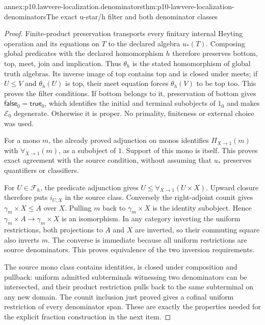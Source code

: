 
\begin{annexitem}{annex:p10.lawvere-localization.denominators}{thm:p10-lawvere-localization-denominators}{The exact u-star/h filter and both denominator classes}
\begin{proof}
Finite-product preservation transports every finitary
internal Heyting operation and its equations on \(T\)
to the declared algebra \(u_*(T)\).  Composing global
predicates with the declared homomorphism \(h\) therefore
preserves bottom, top, meet, join and implication.  Thus
\(\theta_h\) is the stated homomorphism of global truth
algebras.  Its inverse image of top contains top and is
closed under meets; if \(U\leq V\) and \(\theta_h(U)\)
is top, their meet equation forces \(\theta_h(V)\) to
be top too.  This proves the filter conditions.
If bottom belongs to it, preservation of bottom gives
\(\mathsf{false}_0=\mathsf{true}_0\), which identifies
the initial and terminal subobjects of \(1_0\) and
makes \(\mathcal E_0\) degenerate.  Otherwise it is
proper.  No primality, finiteness or external choice
was used.

For a mono \(m\), the already proved adjunction on
monos identifies \(\Pi_{X\to1}(m)\) with
\(\forall_{X\to1}(m)\), as a subobject of \(1\).
Support of this mono is itself.  This proves exact
agreement with the source condition, without assuming
that \(u_*\) preserves quantifiers or classifiers.

For \(U\in\mathcal F_h\), the predicate adjunction
gives \(U\leq\forall_{X\to1}(U\times X)\).
Upward closure therefore puts \(i_{U,X}\) in the
source class.  Conversely the right-adjoint counit
gives \(\gamma_m\times X\leq A\) over \(X\).
Pulling \(m\) back to \(\gamma_m\times X\) is
the identity subobject.  Hence
\(\gamma_m\times A\to\gamma_m\times X\) is an
isomorphism.  In any category inverting the uniform
restrictions, both projections to \(A\) and \(X\)
are inverted, so their commuting square also inverts
\(m\).  The converse is immediate because all uniform
restrictions are source denominators.  This proves
equivalence of the two inversion requirements.

The source mono class contains identities, is closed
under composition and pullback: uniform admitted
subterminals witnessing two denominators can be
intersected, and their product restriction pulls
back to the same subterminal on any new domain.
The counit inclusion just proved gives a cofinal
uniform restriction of every denominator span.
These are exactly the properties needed for the
explicit fraction construction in the next item.
\end{proof}
\end{annexitem}

